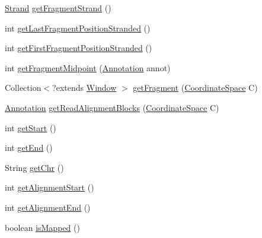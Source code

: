 \begin{DoxyCompactItemize}
\item 
\hyperlink{enumumms_1_1core_1_1annotation_1_1_annotation_1_1_strand}{Strand} \hyperlink{interfaceumms_1_1core_1_1alignment_1_1_alignment_a67d44004454daa9c4ad7fc4dc66c9929}{get\+Fragment\+Strand} ()
\item 
int \hyperlink{interfaceumms_1_1core_1_1alignment_1_1_alignment_a174877831cbae9325d73c7d09906ae3d}{get\+Last\+Fragment\+Position\+Stranded} ()
\item 
int \hyperlink{interfaceumms_1_1core_1_1alignment_1_1_alignment_aac4a1a7ab425219a683a4a43a07ce9d8}{get\+First\+Fragment\+Position\+Stranded} ()
\item 
int \hyperlink{interfaceumms_1_1core_1_1alignment_1_1_alignment_a3c16abce949288dfde66f350c55e3866}{get\+Fragment\+Midpoint} (\hyperlink{interfaceumms_1_1core_1_1annotation_1_1_annotation}{Annotation} annot)
\item 
Collection$<$?extends \hyperlink{interfaceumms_1_1core_1_1feature_1_1_window}{Window} $>$ \hyperlink{interfaceumms_1_1core_1_1alignment_1_1_alignment_afdfc69376b512b44b069c0391c6e81bb}{get\+Fragment} (\hyperlink{interfaceumms_1_1core_1_1coordinatesystem_1_1_coordinate_space}{Coordinate\+Space} C)
\item 
\hyperlink{interfaceumms_1_1core_1_1annotation_1_1_annotation}{Annotation} \hyperlink{interfaceumms_1_1core_1_1alignment_1_1_alignment_aa05560844de602aa9ad47c63c422d73d}{get\+Read\+Alignment\+Blocks} (\hyperlink{interfaceumms_1_1core_1_1coordinatesystem_1_1_coordinate_space}{Coordinate\+Space} C)
\item 
int \hyperlink{interfaceumms_1_1core_1_1alignment_1_1_alignment_a62c8d52837fefe4dec37dc0a550751b9}{get\+Start} ()
\item 
int \hyperlink{interfaceumms_1_1core_1_1alignment_1_1_alignment_afac2284106875d0f138898ad59e399fb}{get\+End} ()
\item 
String \hyperlink{interfaceumms_1_1core_1_1alignment_1_1_alignment_a156e2c6d3a8d3d7d9b8f50af90d0a0c2}{get\+Chr} ()
\item 
int \hyperlink{interfaceumms_1_1core_1_1alignment_1_1_alignment_ac6591781d5421244ad6518a4554f1760}{get\+Alignment\+Start} ()
\item 
int \hyperlink{interfaceumms_1_1core_1_1alignment_1_1_alignment_a9b406dc941d7555254f9b6dcf2ae48da}{get\+Alignment\+End} ()
\item 
boolean \hyperlink{interfaceumms_1_1core_1_1alignment_1_1_alignment_aeb2dbb3707f8f1eb9de40688fdda0ed6}{is\+Mapped} ()
\item 

\end{DoxyCompactItemize}
